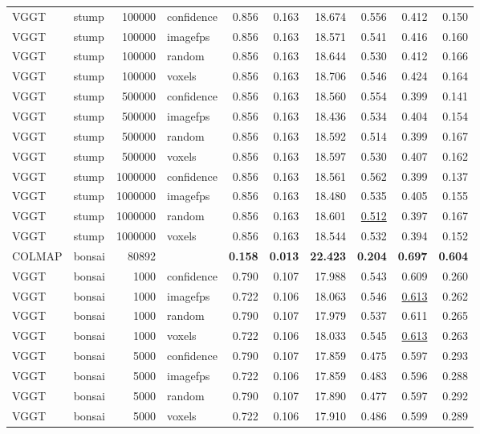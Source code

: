 \begin{table}[H]
\begin{tabular}{llrlrrrrrr}
VGGT & stump & 100000 & confidence & 0.856 & 0.163 & 18.674 & 0.556 & 0.412 & 0.150 \\
VGGT & stump & 100000 & imagefps & 0.856 & 0.163 & 18.571 & 0.541 & 0.416 & 0.160 \\
VGGT & stump & 100000 & random & 0.856 & 0.163 & 18.644 & 0.530 & 0.412 & 0.166 \\
VGGT & stump & 100000 & voxels & 0.856 & 0.163 & 18.706 & 0.546 & 0.424 & 0.164 \\
VGGT & stump & 500000 & confidence & 0.856 & 0.163 & 18.560 & 0.554 & 0.399 & 0.141 \\
VGGT & stump & 500000 & imagefps & 0.856 & 0.163 & 18.436 & 0.534 & 0.404 & 0.154 \\
VGGT & stump & 500000 & random & 0.856 & 0.163 & 18.592 & 0.514 & 0.399 & 0.167 \\
VGGT & stump & 500000 & voxels & 0.856 & 0.163 & 18.597 & 0.530 & 0.407 & 0.162 \\
VGGT & stump & 1000000 & confidence & 0.856 & 0.163 & 18.561 & 0.562 & 0.399 & 0.137 \\
VGGT & stump & 1000000 & imagefps & 0.856 & 0.163 & 18.480 & 0.535 & 0.405 & 0.155 \\
VGGT & stump & 1000000 & random & 0.856 & 0.163 & 18.601 & \underline{0.512} & 0.397 & 0.167 \\
VGGT & stump & 1000000 & voxels & 0.856 & 0.163 & 18.544 & 0.532 & 0.394 & 0.152 \\
\midrule
COLMAP & bonsai & 80892 &  & \textbf{0.158} & \textbf{0.013} & \textbf{22.423} & \textbf{0.204} & \textbf{0.697} & \textbf{0.604} \\
VGGT & bonsai & 1000 & confidence & 0.790 & 0.107 & 17.988 & 0.543 & 0.609 & 0.260 \\
VGGT & bonsai & 1000 & imagefps & 0.722 & 0.106 & 18.063 & 0.546 & \underline{0.613} & 0.262 \\
VGGT & bonsai & 1000 & random & 0.790 & 0.107 & 17.979 & 0.537 & 0.611 & 0.265 \\
VGGT & bonsai & 1000 & voxels & 0.722 & 0.106 & 18.033 & 0.545 & \underline{0.613} & 0.263 \\
VGGT & bonsai & 5000 & confidence & 0.790 & 0.107 & 17.859 & 0.475 & 0.597 & 0.293 \\
VGGT & bonsai & 5000 & imagefps & 0.722 & 0.106 & 17.859 & 0.483 & 0.596 & 0.288 \\
VGGT & bonsai & 5000 & random & 0.790 & 0.107 & 17.890 & 0.477 & 0.597 & 0.292 \\
VGGT & bonsai & 5000 & voxels & 0.722 & 0.106 & 17.910 & 0.486 & 0.599 & 0.289 \\

\end{tabular}
\end{table}
